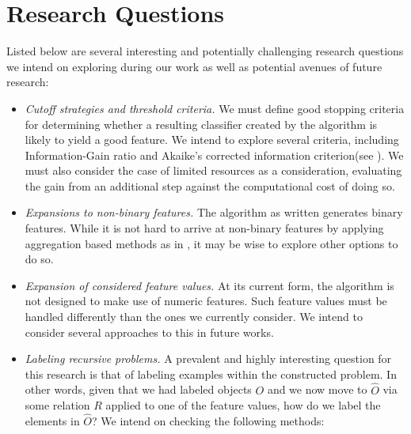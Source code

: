 \documentclass[12pt, a4paper]{article}
\theoremstyle{definition}
\begin{document}
\section{Research Questions}
Listed below are several interesting and potentially challenging research questions we intend on exploring during our work as well as potential avenues of future research:
\begin{itemize}
    \item \emph{Cutoff strategies and threshold criteria.} We must define good stopping criteria for determining whether a resulting classifier created by the algorithm is likely to yield a good feature. We intend to explore several criteria, including Information-Gain ratio\citep{quinlan1986} and Akaike's corrected information criterion(see \citet{burnham2002model}). We must also consider the case of limited resources as a consideration, evaluating the gain from an additional step against the computational cost of doing so. %
    \item \emph{Expansions to non-binary features.} The algorithm as written generates binary features. While it is not hard to arrive at non-binary features by applying aggregation based methods as in \citet{popescul2003statistical}, it may be wise to explore other options to do so.
    \item \emph{Expansion of considered feature values.} At its current form, the algorithm is not designed to make use of numeric features. Such feature values must be handled differently than the ones we currently consider. We intend to consider several approaches to this in future works.
    \item \emph{Labeling recursive problems.} A prevalent and highly interesting question for this research is that of labeling examples within the constructed problem. In other words, given that we had labeled objects $O$ and we now move to $\hat{O}$ via some relation $R$ applied to one of the feature values, how do we label the elements in $\hat{O}$? We intend on checking the following methods:
        \begin{itemize}

\end{itemize}
\end{itemize}
\end{document}
